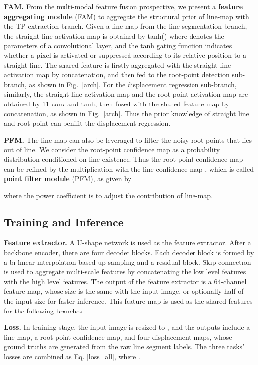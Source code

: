 \documentclass[runningheads]{llncs}
\begin{document}
\textbf{FAM.}
From the multi-modal feature fusion prospective, we present a \textbf{feature aggregating module} (FAM) to aggregate the structural prior of line-map with the TP extraction branch. Given a line-map  from the line segmentation branch, the straight line activation map  is obtained by tanh() where  denotes the parameters of a  convolutional layer, and the tanh gating function indicates whether a pixel is activated or suppressed according to its relative position to a straight line. The shared feature is firstly aggregated with the straight line activation map  by concatenation, and then fed to the root-point detection sub-branch, as shown in Fig.~\ref{arch}.
For the displacement regression sub-branch, similarly, the straight line activation map and the root-point activation map are obtained by 11 conv and tanh, then fused with the shared feature map by concatenation, as shown in Fig.~\ref{arch}. Thus the prior knowledge of straight line and root point can benifit the displacement regression.


\textbf{PFM.}
The line-map can also be leveraged to filter the noisy root-points that lies out of line. We consider the root-point confidence map as a probability distribution  conditioned on line existence. Thus the root-point confidence map  can be refined by the multiplication with the line confidence map , which is called \textbf{point filter module} (PFM), as given by

where the power coefficient  is to adjust the contribution of line-map.


\subsection{Training and Inference}\label{infer}

\textbf{Feature extractor.}
A U-shape network is used as the feature extractor. After a backbone encoder, there are four decoder blocks. Each decoder block is formed by a bi-linear interpolation based up-sampling and a residual block. Skip connection is used to aggregate multi-scale features by concatenating the low level features with the high level features. The output of the feature extractor is a 64-channel feature map, whose size is the same with the input image, or optionally half of the input size for faster inference. This feature map is used as the shared features for the following branches.

\textbf{Loss.}
In training stage, the input image is resized to , and the outputs include a line-map, a root-point confidence map, and four displacement maps, whose ground truths are generated from the raw line segment labels. The three tasks' losses are combined as Eq. \eqref{loss_all}, where . 
\end{document}
